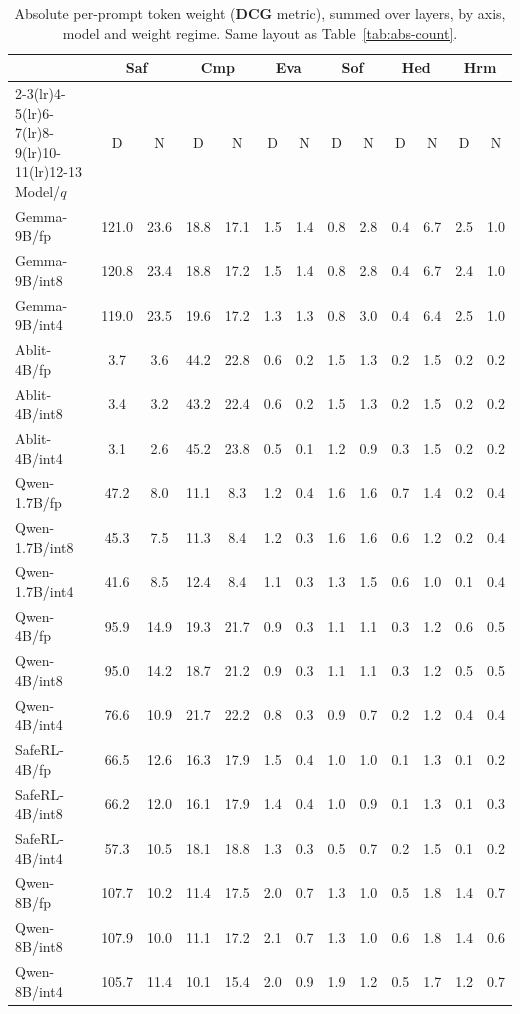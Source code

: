 \documentclass[10pt,twocolumn]{article}
\begin{document}
\begin{table}[p]
\centering\footnotesize
\setlength{\tabcolsep}{3.2pt}
\caption{Absolute per-prompt token weight (\textbf{DCG} metric), summed over layers, by
axis, model and weight regime. Same layout as Table~\ref{tab:abs-count}.}
\label{tab:abs-dcg}
\begin{tabular}{@{}l*{12}{c}@{}}
\toprule
& \multicolumn{2}{c}{Saf} & \multicolumn{2}{c}{Cmp} & \multicolumn{2}{c}{Eva}
& \multicolumn{2}{c}{Sof} & \multicolumn{2}{c}{Hed} & \multicolumn{2}{c}{Hrm} \\
\cmidrule(lr){2-3}\cmidrule(lr){4-5}\cmidrule(lr){6-7}\cmidrule(lr){8-9}\cmidrule(lr){10-11}\cmidrule(lr){12-13}
Model/$q$ & D & N & D & N & D & N & D & N & D & N & D & N \\
\midrule
Gemma-9B/fp   & 121.0 & 23.6 & 18.8 & 17.1 & 1.5 & 1.4 & 0.8 & 2.8 & 0.4 & 6.7 & 2.5 & 1.0 \\
Gemma-9B/int8 & 120.8 & 23.4 & 18.8 & 17.2 & 1.5 & 1.4 & 0.8 & 2.8 & 0.4 & 6.7 & 2.4 & 1.0 \\
Gemma-9B/int4 & 119.0 & 23.5 & 19.6 & 17.2 & 1.3 & 1.3 & 0.8 & 3.0 & 0.4 & 6.4 & 2.5 & 1.0 \\
Ablit-4B/fp   & 3.7 & 3.6 & 44.2 & 22.8 & 0.6 & 0.2 & 1.5 & 1.3 & 0.2 & 1.5 & 0.2 & 0.2 \\
Ablit-4B/int8 & 3.4 & 3.2 & 43.2 & 22.4 & 0.6 & 0.2 & 1.5 & 1.3 & 0.2 & 1.5 & 0.2 & 0.2 \\
Ablit-4B/int4 & 3.1 & 2.6 & 45.2 & 23.8 & 0.5 & 0.1 & 1.2 & 0.9 & 0.3 & 1.5 & 0.2 & 0.2 \\
Qwen-1.7B/fp   & 47.2 & 8.0 & 11.1 & 8.3 & 1.2 & 0.4 & 1.6 & 1.6 & 0.7 & 1.4 & 0.2 & 0.4 \\
Qwen-1.7B/int8 & 45.3 & 7.5 & 11.3 & 8.4 & 1.2 & 0.3 & 1.6 & 1.6 & 0.6 & 1.2 & 0.2 & 0.4 \\
Qwen-1.7B/int4 & 41.6 & 8.5 & 12.4 & 8.4 & 1.1 & 0.3 & 1.3 & 1.5 & 0.6 & 1.0 & 0.1 & 0.4 \\
Qwen-4B/fp   & 95.9 & 14.9 & 19.3 & 21.7 & 0.9 & 0.3 & 1.1 & 1.1 & 0.3 & 1.2 & 0.6 & 0.5 \\
Qwen-4B/int8 & 95.0 & 14.2 & 18.7 & 21.2 & 0.9 & 0.3 & 1.1 & 1.1 & 0.3 & 1.2 & 0.5 & 0.5 \\
Qwen-4B/int4 & 76.6 & 10.9 & 21.7 & 22.2 & 0.8 & 0.3 & 0.9 & 0.7 & 0.2 & 1.2 & 0.4 & 0.4 \\
SafeRL-4B/fp   & 66.5 & 12.6 & 16.3 & 17.9 & 1.5 & 0.4 & 1.0 & 1.0 & 0.1 & 1.3 & 0.1 & 0.2 \\
SafeRL-4B/int8 & 66.2 & 12.0 & 16.1 & 17.9 & 1.4 & 0.4 & 1.0 & 0.9 & 0.1 & 1.3 & 0.1 & 0.3 \\
SafeRL-4B/int4 & 57.3 & 10.5 & 18.1 & 18.8 & 1.3 & 0.3 & 0.5 & 0.7 & 0.2 & 1.5 & 0.1 & 0.2 \\
Qwen-8B/fp   & 107.7 & 10.2 & 11.4 & 17.5 & 2.0 & 0.7 & 1.3 & 1.0 & 0.5 & 1.8 & 1.4 & 0.7 \\
Qwen-8B/int8 & 107.9 & 10.0 & 11.1 & 17.2 & 2.1 & 0.7 & 1.3 & 1.0 & 0.6 & 1.8 & 1.4 & 0.6 \\
Qwen-8B/int4 & 105.7 & 11.4 & 10.1 & 15.4 & 2.0 & 0.9 & 1.9 & 1.2 & 0.5 & 1.7 & 1.2 & 0.7 \\
\bottomrule
\end{tabular}
\end{table}
\end{document}
